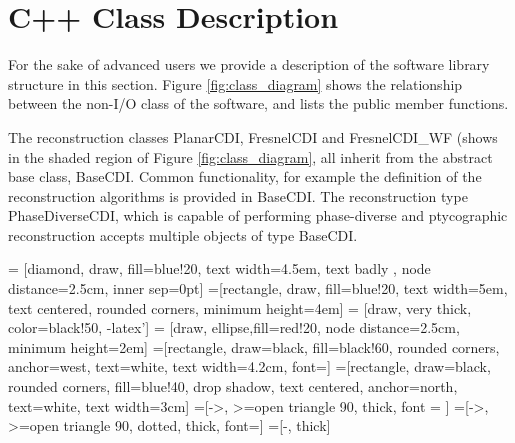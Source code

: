 \documentclass[]{nadia}
\begin{document}
\newpage

\appendix

\section{C++ Class Description}
\label{sec:c++}

For the sake of advanced users we provide a description of the
software library structure in this section. Figure
\ref{fig:class_diagram} shows the relationship between the non-I/O
class of the software, and lists the public member functions.

The reconstruction classes PlanarCDI, FresnelCDI and FresnelCDI\_WF
(shows in the shaded region of Figure \ref{fig:class_diagram}, all
inherit from the abstract base class, BaseCDI. Common functionality,
for example the definition of the reconstruction algorithms is
provided in BaseCDI. The reconstruction type PhaseDiverseCDI, which is
capable of performing phase-diverse and ptycographic reconstruction
accepts multiple objects of type BaseCDI.

 = [diamond, draw, fill=blue!20,
text width=4.5em, text badly , node distance=2.5cm, inner sep=0pt]
=[rectangle, draw, fill=blue!20, text width=5em, text centered, rounded corners, minimum height=4em]
 = [draw, very thick, color=black!50, -latex']
 = [draw, ellipse,fill=red!20, node distance=2.5cm,
minimum height=2em]
=[rectangle, draw=black, fill=black!60, rounded corners,
anchor=west, text=white, text width=4.2cm, font=\tiny]
=[rectangle, draw=black, rounded corners, fill=blue!40, drop shadow,
text centered, anchor=north, text=white, text width=3cm]
=[->, >=open triangle 90, thick, font = \tiny]
=[->, >=open triangle 90, dotted, thick, font=\tiny]
=[-, thick]
\end{document}
